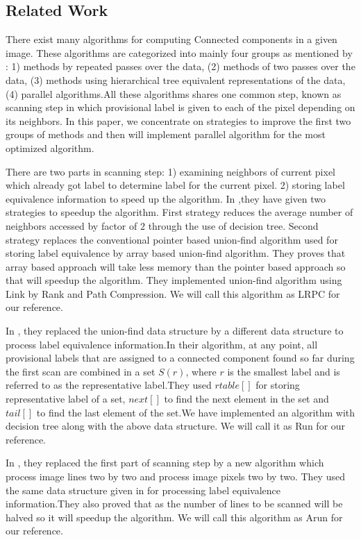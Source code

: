 \subsection{Related Work}
\label{sec:relatedworks}

There exist many algorithms for computing Connected components in a given image. These algorithms are categorized into mainly four groups as mentioned by \cite{Suzuki2003_Linear}: 1) methods by repeated passes over the data, (2) methods of two passes over the data, (3) methods using hierarchical tree equivalent representations of the data, (4) parallel algorithms.All these algorithms shares one common step, known as scanning step in which provisional label is given to each of the pixel depending on its neighbors. In this paper, we concentrate on strategies to improve the first two groups of methods and then will implement parallel algorithm for the most optimized algorithm.

There are two parts in scanning step: 1) examining neighbors of current pixel which already got label to determine label for the current pixel. 2) storing label equivalence information to speed up the algorithm. In \cite{Wu2009_LRPC} ,they have given two strategies to speedup the algorithm. First strategy reduces the average number of neighbors accessed by factor of $2$ through the use of decision tree. Second strategy replaces the conventional pointer based union-find algorithm used for storing label equivalence by array based union-find algorithm. They proves that array based approach will take less memory than the pointer based approach so that will speedup the algorithm. They implemented union-find algorithm using Link by Rank and Path Compression. We will call this algorithm as LRPC for our reference.

In \cite{He2008_Run}, they replaced the union-find data structure by a different data structure to process label equivalence information.In their algorithm, at any point, all provisional labels that are assigned to a connected component found so far during the first scan are combined in a set $S(r)$, where $r$ is the smallest label and is referred to as the representative label.They used $rtable[]$ for storing representative label of a set, $next[]$ to find the next element in the set and $tail[]$ to find the last element of the set.We have implemented an algorithm with decision tree along with the above data structure. We will call it as Run for our reference.

In \cite{He2012_ARun}, they replaced the first part of scanning step by a new algorithm which process image lines two by two and process image pixels two by two. They used the same data structure given in \cite{He2008_Run} for processing label equivalence information.They also proved that as the number of lines to be scanned will be halved so it will speedup the algorithm. We will call this algorithm as Arun for our reference.

